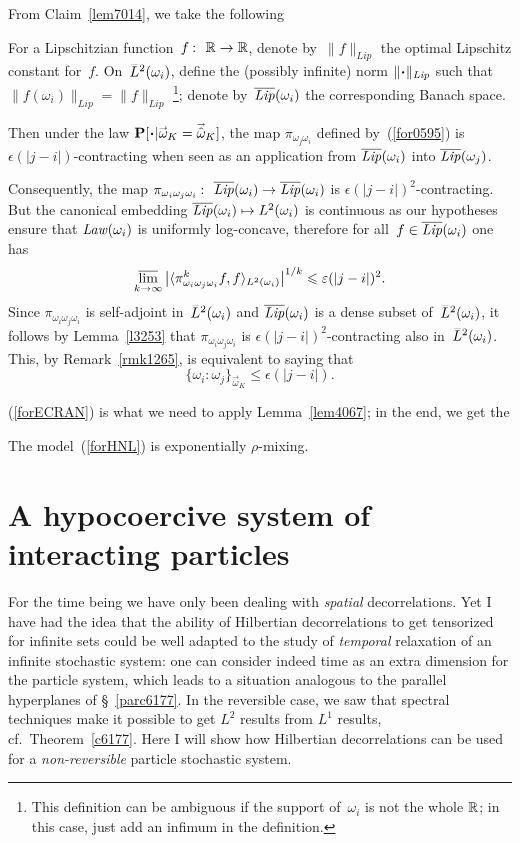 From Claim~\ref{lem7014}, we take the following
%
\begin{Cor}
For a Lipschitzian function~$f \colon \RR\to\RR$,
denote by~$\|f\|_{\mathit{Lip}}$ the optimal Lipschitz constant for~$f$.
On~$\ldb(\omega_i)$, define the (possibly infinite) norm $\|\Bcdot\|_{\mathit{Lip}}$
such that $\|f(\omega_i)\|_{\mathit{Lip}} = \|f\|_{\mathit{Lip}}$%
\footnote{This definition can be ambiguous if the support of~$\omega_i$ is not the whole $\mathbb{R}$; in this case, just add an infimum in the definition.};
denote by~$\overline{\mathit{Lip}}(\omega_i)$ the corresponding Banach space.

Then under the law $\Pr[\Bcdot|\vec\omega_K=\vechat{\omega}_K]$,
the map $\pi_{\omega_j\omega_i}$ defined by~(\ref{for0595}) is $\epsilon(|j-i|)$-contracting
when seen as an application from $\overline{\mathit{Lip}}(\omega_i)$ into $\overline{\mathit{Lip}}(\omega_j)$.
\end{Cor}

Consequently, the map
$\pi_{\omega_i\omega_j\omega_i} \colon \barLip(\omega_i) \to \barLip(\omega_i)$
is $\epsilon(|j-i|)^2$-contracting.
But the canonical embedding $\barLip(\omega_i) \mapsto \ldb(\omega_i)$ is continuous
as our hypotheses ensure that $\operatorname{\mathit{Law}}(\omega_i)$ is uniformly log-concave,
therefore for all~$f \in \overline{\mathit{Lip}}(\omega_i)$ one has
\[ \limsup_{k\longto\infty}
\big|\langle \pi_{\omega_i\omega_j\omega_i}^k f, f \rangle_{\ldb(\omega_i)}\big|^{1/k}
\leq \epsilon(|j-i|)^2 .\]
%
Since $\pi_{\omega_i\omega_j\omega_i}$ is self-adjoint in~$\ldb(\omega_i)$
and $\overline{\mathit{Lip}}(\omega_i)$ is a dense subset of~$\ldb(\omega_i)$,
it follows by Lemma~\ref{l3253} that $\pi_{\omega_i\omega_j\omega_i}$ is
$\epsilon(|j-i|)^2$-contracting also in~$\ldb(\omega_i)$.
This, by Remark~\ref{rmk1265}, is equivalent to saying that
%
\[\label{forECRAN} \{\omega_i:\omega_j\}_{\vec\omega_K} \leq \epsilon(|j-i|) . \]

(\ref{forECRAN}) is what we need to apply Lemma~\ref{lem4067};
in the end, we get the
%
\begin{Thm}\label{thmLama}
The model~(\ref{forHNL}) is exponentially $\rho$-mixing.
\end{Thm}



\section{A hypocoercive system of interacting particles}%
\label{parAHypocoerciveSystemOfInteractingParticles}

For the time being we have only been dealing with \emph{spatial} decorrelations.
Yet I have had the idea that
the ability of Hilbertian decorrelations to get tensorized for infinite sets
could be well adapted to the study of \emph{temporal} relaxation of an infinite stochastic system:
one can consider indeed time as an extra dimension for the particle system,
which leads to a situation analogous to the parallel hyperplanes of \S~\ref{parc6177}.
In the reversible case, we saw that spectral techniques
make it possible to get $L^2$ results from $L^1$ results, cf.\ Theorem~\ref{c6177}.
Here I will show how Hilbertian decorrelations can be used
for a \emph{non-reversible} particle stochastic system.

